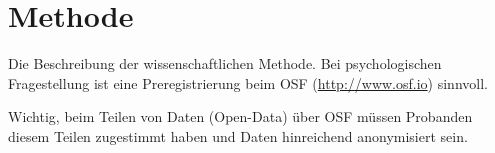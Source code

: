\chapter{Methode}
Die Beschreibung der wissenschaftlichen Methode. 
Bei psychologischen Fragestellung ist eine Preregistrierung beim OSF (\url{http://www.osf.io}) sinnvoll.

Wichtig, beim Teilen von Daten (Open-Data) über OSF müssen Probanden diesem Teilen zugestimmt haben und Daten hinreichend anonymisiert sein.
